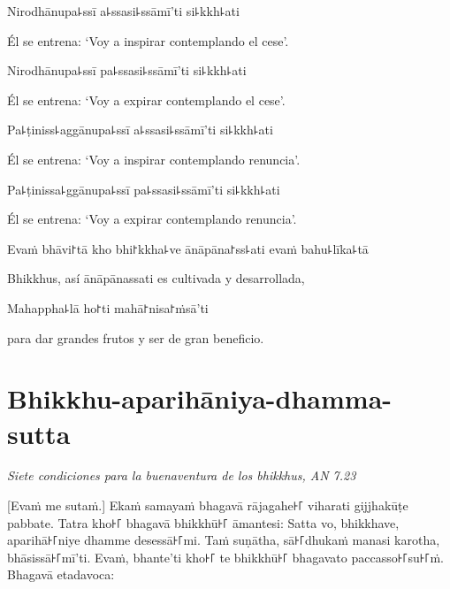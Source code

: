 Nirodhānupa꜕ssī a꜕ssasi꜕ssāmī'ti si꜕kkh꜕ati

\begin{english}
  Él se entrena: `Voy a inspirar contemplando el cese'.
\end{english}

Nirodhānupa꜕ssī pa꜕ssasi꜕ssāmī'ti si꜕kkh꜕ati

\begin{english}
  Él se entrena: `Voy a expirar contemplando el cese'.
\end{english}

Pa꜕ṭiniss꜕aggānupa꜕ssī a꜕ssasi꜕ssāmī'ti si꜕kkh꜕ati

\begin{english}
  Él se entrena: `Voy a inspirar contemplando renuncia'.
\end{english}

Pa꜕ṭinissa꜕ggānupa꜕ssī pa꜕ssasi꜕ssāmī'ti si꜕kkh꜕ati

\begin{english}
  Él se entrena: `Voy a expirar contemplando renuncia'.
\end{english}

Evaṁ bhāvi꜓tā kho bhi꜓kkha꜕ve ānāpāna꜓ss꜕ati evaṁ bahu꜕līka꜕tā

\begin{english}
  Bhikkhus, así ānāpānassati es cultivada y desarrollada,
\end{english}

Mahappha꜕lā ho꜓ti mahā꜓nisa꜓ṁsā'ti

\begin{english}
  para dar grandes frutos y ser de gran beneficio.
\end{english}


\chapter[Aparihāniya-dhamma-sutta]{Bhikkhu-aparihāniya-dhamma-sutta}

\emph{Siete condiciones para la buenaventura de los bhikkhus, AN 7.23}

\begin{leader}
\end{leader}

[Evaṁ me sutaṁ.] Ekaṁ samayaṁ bhagavā rājagahe꜔꜒ viharati gijjhakūṭe pabbate.
Tatra kho꜔꜒ bhagavā bhikkhū꜔꜒ āmantesi: Satta vo, bhikkhave, aparihā꜔꜒niye dhamme
desessā꜔꜒mi. Taṁ suṇātha, sā꜔꜒dhukaṁ manasi karotha, bhāsissā꜔꜒mī'ti. Evaṁ, bhante'ti
kho꜔꜒ te bhikkhū꜔꜒ bhagavato paccasso꜔꜒su꜔꜒ṁ. Bhagavā etadavoca:

